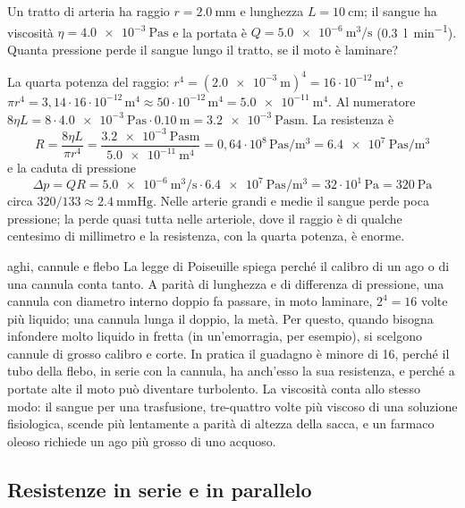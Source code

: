 \begin{esempio}
Un tratto di arteria ha raggio $r = \SI{2,0}{\milli\metre}$ e lunghezza $L = \SI{10}{\centi\metre}$; il sangue ha viscosità $\eta = \SI{4,0e-3}{\pascal\second}$ e la portata è $Q = \SI{5,0e-6}{\metre\cubed\per\second}$ (\SI{0,3}{\litre\per\minute}). Quanta pressione perde il sangue lungo il tratto, se il moto è laminare?

La quarta potenza del raggio: $r^4 = (\SI{2,0e-3}{\metre})^4 = 16 \cdot 10^{-12}\,\si{\metre\tothe{4}}$, e $\pi r^4 = 3{,}14 \cdot 16 \cdot 10^{-12}\,\si{\metre\tothe{4}} \approx 50 \cdot 10^{-12}\,\si{\metre\tothe{4}} = \SI{5,0e-11}{\metre\tothe{4}}$. Al numeratore $8\eta L = 8 \cdot \SI{4,0e-3}{\pascal\second} \cdot \SI{0,10}{\metre} = \SI{3,2e-3}{\pascal\second\metre}$. La resistenza è
\[
  R = \frac{8\eta L}{\pi r^4} = \frac{\SI{3,2e-3}{\pascal\second\metre}}{\SI{5,0e-11}{\metre\tothe{4}}} = 0{,}64 \cdot 10^{8}\,\si{\pascal\second\per\metre\cubed} = \SI{6,4e7}{\pascal\second\per\metre\cubed}
\]
e la caduta di pressione
\[
  \Delta p = QR = \SI{5,0e-6}{\metre\cubed\per\second} \cdot \SI{6,4e7}{\pascal\second\per\metre\cubed} = 32 \cdot 10^{1}\,\si{\pascal} = \SI{320}{\pascal}
\]
circa $320/133 \approx \SI{2,4}{\mmHg}$. Nelle arterie grandi e medie il sangue perde poca pressione; la perde quasi tutta nelle arteriole, dove il raggio è di qualche centesimo di millimetro e la resistenza, con la quarta potenza, è enorme.
\end{esempio}

\begin{applicazione}{aghi, cannule e flebo}
La legge di Poiseuille spiega perché il calibro di un ago o di una cannula conta tanto. A parità di lunghezza e di differenza di pressione, una cannula con diametro interno doppio fa passare, in moto laminare, $2^4 = 16$ volte più liquido; una cannula lunga il doppio, la metà. Per questo, quando bisogna infondere molto liquido in fretta (in un'emorragia, per esempio), si scelgono cannule di grosso calibro e corte. In pratica il guadagno è minore di 16, perché il tubo della flebo, in serie con la cannula, ha anch'esso la sua resistenza, e perché a portate alte il moto può diventare turbolento. La viscosità conta allo stesso modo: il sangue per una trasfusione, tre-quattro volte più viscoso di una soluzione fisiologica, scende più lentamente a parità di altezza della sacca, e un farmaco oleoso richiede un ago più grosso di uno acquoso.
\end{applicazione}

\subsection{Resistenze in serie e in parallelo}

